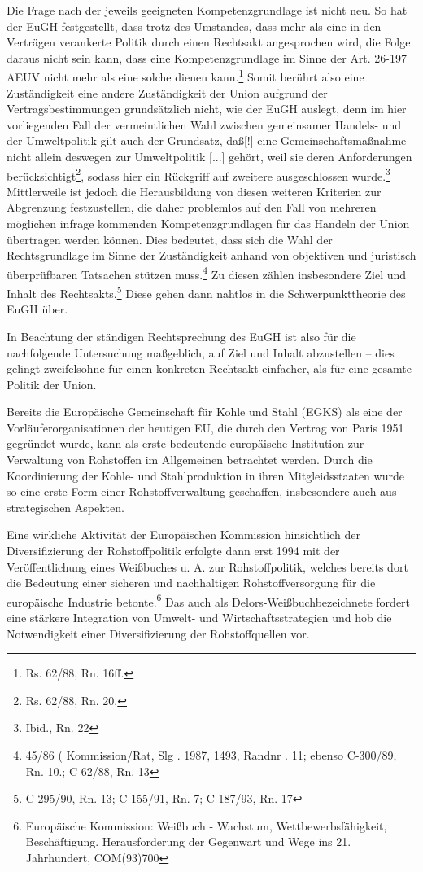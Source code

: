 \documentclass[12pt,a4paper,oneside]{book} %
\begin{document}
	Die Frage nach der jeweils geeigneten Kompetenzgrundlage ist nicht neu. So hat der EuGH festgestellt, dass trotz des Umstandes, dass mehr als eine in den Verträgen verankerte Politik durch einen Rechtsakt angesprochen wird, die Folge daraus nicht sein kann, dass eine Kompetenzgrundlage im Sinne der Art. 26-197 AEUV nicht mehr als eine solche dienen kann.\footnote{Rs. 62/88, Rn. 16ff.} Somit berührt also eine Zuständigkeit eine andere Zuständigkeit der Union aufgrund der Vertragsbestimmungen grundsätzlich nicht, wie der EuGH auslegt, denn im hier vorliegenden Fall der vermeintlichen Wahl zwischen gemeinsamer Handels- und der Umweltpolitik gilt auch der Grundsatz, \glqq daß[!] eine Gemeinschaftsmaßnahme nicht allein deswegen zur Umweltpolitik [...] gehört, weil sie deren Anforderungen berücksichtigt\grqq\footnote{Rs. 62/88, Rn. 20.}, sodass hier ein Rückgriff auf zweitere ausgeschlossen wurde.\footnote{Ibid., Rn. 22} Mittlerweile ist jedoch die Herausbildung von diesen weiteren Kriterien zur Abgrenzung festzustellen, die daher problemlos auf den Fall von mehreren möglichen infrage kommenden Kompetenzgrundlagen für das Handeln der Union übertragen werden können.\autocite{Callies, Berliner Beiträge Nr. 117, S. 11.} Dies bedeutet, dass sich die Wahl der Rechtsgrundlage im Sinne der Zuständigkeit anhand von objektiven und juristisch überprüfbaren Tatsachen stützen muss.\footnote{45/86 ( Kommission/Rat, Slg . 1987, 1493, Randnr . 11; ebenso C-300/89, Rn. 10.; C-62/88, Rn. 13} Zu diesen zählen insbesondere Ziel und Inhalt des Rechtsakts.\footnote{C-295/90, Rn. 13; C-155/91, Rn. 7; C-187/93, Rn. 17} Diese gehen dann nahtlos in die Schwerpunkttheorie des EuGH über.
	
	In Beachtung der ständigen Rechtsprechung des EuGH ist also für die nachfolgende Untersuchung maßgeblich, auf Ziel und Inhalt abzustellen -- dies gelingt zweifelsohne für einen konkreten Rechtsakt einfacher, als für eine gesamte Politik der Union.
	
	Bereits die Europäische Gemeinschaft für Kohle und Stahl (EGKS) als eine der Vorläuferorganisationen der heutigen EU, die durch den Vertrag von Paris 1951 gegründet wurde, kann als erste bedeutende europäische Institution zur Verwaltung von Rohstoffen im Allgemeinen betrachtet werden. Durch die Koordinierung der Kohle- und Stahlproduktion in ihren Mitgleidsstaaten wurde so eine erste Form einer Rohstoffverwaltung geschaffen, insbesondere auch aus strategischen Aspekten.%
	
	Eine wirkliche Aktivität der Europäischen Kommission hinsichtlich der Diversifizierung der Rohstoffpolitik erfolgte dann erst 1994 mit der Veröffentlichung eines Weißbuches u. A. zur Rohstoffpolitik, welches bereits dort die Bedeutung einer sicheren und nachhaltigen Rohstoffversorgung für die europäische Industrie betonte.\footnote{Europäische Kommission: Weißbuch - Wachstum, Wettbewerbsfähigkeit, Beschäftigung. Herausforderung der Gegenwart und Wege ins 21. Jahrhundert, COM(93)700}
	Das auch als \glqq Delors-Weißbuch\grqq bezeichnete  fordert eine stärkere Integration von Umwelt- und Wirtschaftsstrategien und hob die Notwendigkeit einer Diversifizierung der Rohstoffquellen vor.
	
\end{document}
